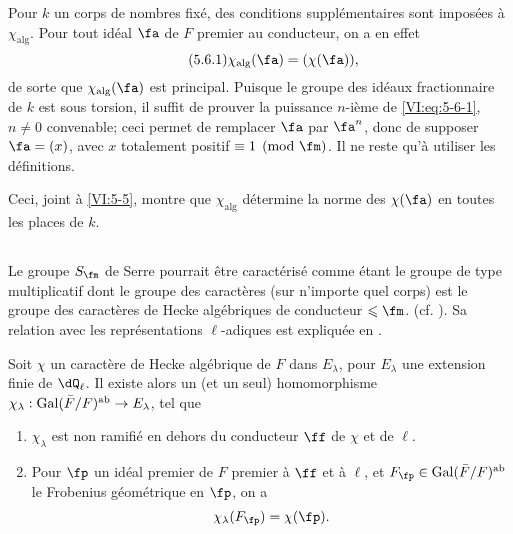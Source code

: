 Pour $k$ un corps de nombres fixé, des conditions supplémentaires sont 
imposées à $\chi_\text{alg}$. Pour tout idéal $\fa$ de $F$ premier au 
conducteur, on a en effet 
\begin{equation*}\tag{5.6.1}\label{VI:eq:5-6-1}
  \chi_\text{alg}(\fa) = (\chi(\fa)) \text{,} 
\end{equation*}
de sorte que $\chi_\text{alg}(\fa)$ est principal. Puisque le groupe des 
idéaux fractionnaire de $k$ est sous torsion, il suffit de prouver la 
puissance $n$-ième de \eqref{VI:eq:5-6-1}, $n\ne 0$ convenable; ceci permet 
de remplacer $\fa$ par $\fa^n$, donc de supposer $\fa=(x)$, avec $x$ totalement 
positif $\equiv 1\pmod\fm$. Il ne reste qu'à utiliser les définitions. 

Ceci, joint à \ref{VI:5-5}, montre que $\chi_\text{alg}$ détermine la norme 
des $\chi(\fa)$ en toutes les places de $k$. 





\subsection{}\label{VI:5-7}

Le groupe $S_\fm$ de Serre pourrait être caractérisé comme étant le 
groupe de type multiplicatif dont le groupe des caractères (sur n'importe 
quel corps) est le groupe des caractères de Hecke algébriques de conducteur 
$\leqslant \fm$. (cf. \cite[II 2.1 et 2.2]{se68}). Sa relation avec les 
représentations $\ell$-adiques est expliquée en \cite[II 2.3]{se68}. 





\begin{theorem_}[{\cite{se68}}]\label{VI:5-8}
Soit $\chi$ un caractère de Hecke algébrique de $F$ dans $E_\lambda$, pour 
$E_\lambda$ une extension finie de $\dQ_\ell$. Il existe alors un (et un seul) 
homomorphisme $\chi_\lambda:\operatorname{Gal}(\bar F/F)^\textnormal{ab} \to E_\lambda$, tel 
que 
\begin{enumerate}[\indent (i)]
  \item $\chi_\lambda$ est non ramifié en dehors du conducteur $\ff$ de 
    $\chi$ et de $\ell$. 
  \item Pour $\fp$ un idéal premier de $F$ premier à $\ff$ et à $\ell$, 
    et $F_\fp\in \gal(\bar F/F)^\textnormal{ab}$ le Frobenius géométrique 
    en $\fp$, on a 
    \[
      \chi_\lambda(F_\fp) = \chi(\fp) \text{.}
    \] 
\end{enumerate}
\end{theorem_}





